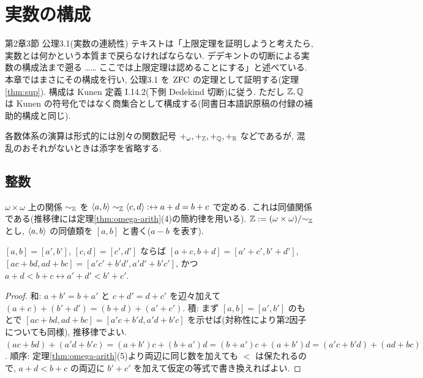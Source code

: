 \chapter{実数の構成}\label{ch:reals}

\begin{textref}{第2章3節 公理3.1(実数の連続性)}
  テキストは「上限定理を証明しようと考えたら, 実数とは何かという本質まで戻らなければならない. デデキントの切断による実数の構成法まで遡る …… ここでは上限定理は認めることにする」と述べている. 本章ではまさにその構成を行い, 公理3.1 を $\mathrm{ZFC}$ の定理として証明する(定理\ref{thm:sup}). 構成は Kunen \cite{kunen2011} 定義 I.14.2(下側 Dedekind 切断)に従う. ただし $\mathbb{Z}, \mathbb{Q}$ は Kunen の符号化ではなく商集合として構成する(同書日本語訳原稿の付録の補助的構成と同じ).
\end{textref}

各数体系の演算は形式的には別々の関数記号 $+_\omega, +_{\mathbb{Z}}, +_{\mathbb{Q}}, +_{\mathbb{R}}$ などであるが, 混乱のおそれがないときは添字を省略する.

\section{整数}

\begin{dfn}
  $\omega \times \omega$ 上の関係 $\sim_{\mathbb{Z}}$ を $\langle a,b\rangle \sim_{\mathbb{Z}} \langle c,d\rangle :\leftrightarrow a + d = b + c$ で定める. これは同値関係である(推移律には定理\ref{thm:omega-arith}(4)の簡約律を用いる). $\mathbb{Z} := (\omega \times \omega)/{\sim_{\mathbb{Z}}}$ とし, $\langle a,b\rangle$ の同値類を $[a,b]$ と書く($a - b$ を表す).
\end{dfn}

\begin{lem}\label{lem:Z-welldef}
  $[a,b] = [a',b']$, $[c,d] = [c',d']$ ならば $[a+c, b+d] = [a'+c', b'+d']$, $[ac + bd, ad + bc] = [a'c' + b'd', a'd' + b'c']$, かつ $a + d < b + c \leftrightarrow a' + d' < b' + c'$.
\end{lem}
\begin{proof}
  和: $a + b' = b + a'$ と $c + d' = d + c'$ を辺々加えて $(a+c) + (b'+d') = (b+d) + (a'+c')$. 積: まず $[a,b] = [a',b']$ のもとで $[ac+bd, ad+bc] = [a'c+b'd, a'd+b'c]$ を示せば(対称性により第2因子についても同様), 推移律でよい. $(ac+bd) + (a'd+b'c) = (a+b')c + (b+a')d = (b+a')c + (a+b')d = (a'c + b'd) + (ad+bc)$. 順序: 定理\ref{thm:omega-arith}(5)より両辺に同じ数を加えても $<$ は保たれるので, $a+d<b+c$ の両辺に $b'+c'$ を加えて仮定の等式で書き換えればよい.
\end{proof}

